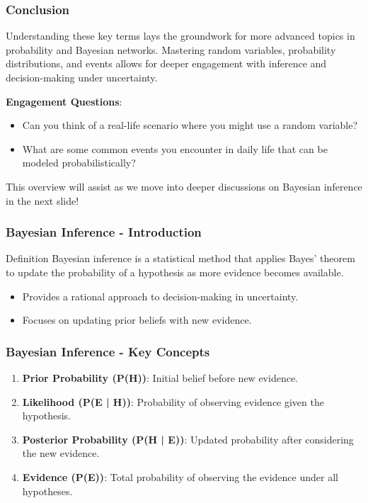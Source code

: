 \documentclass[aspectratio=169]{beamer}
\begin{document}
\begin{frame}[fragile]
  \frametitle{Conclusion}
  Understanding these key terms lays the groundwork for more advanced topics in probability and Bayesian networks. 
  Mastering random variables, probability distributions, and events allows for deeper engagement with inference and decision-making under uncertainty.
  
  \textbf{Engagement Questions}:
  \begin{itemize}
    \item Can you think of a real-life scenario where you might use a random variable?
    \item What are some common events you encounter in daily life that can be modeled probabilistically?
  \end{itemize}
  
  This overview will assist as we move into deeper discussions on Bayesian inference in the next slide!
\end{frame}

\begin{frame}[fragile]
    \frametitle{Bayesian Inference - Introduction}
    \begin{block}{Definition}
        Bayesian inference is a statistical method that applies Bayes' theorem to update the probability of a hypothesis as more evidence becomes available.
    \end{block}
    \begin{itemize}
        \item Provides a rational approach to decision-making in uncertainty.
        \item Focuses on updating prior beliefs with new evidence.
    \end{itemize}
\end{frame}

\begin{frame}[fragile]
    \frametitle{Bayesian Inference - Key Concepts}
    \begin{enumerate}
        \item \textbf{Prior Probability (P(H))}: Initial belief before new evidence.
        \item \textbf{Likelihood (P(E | H))}: Probability of observing evidence given the hypothesis.
        \item \textbf{Posterior Probability (P(H | E))}: Updated probability after considering the new evidence.
        \item \textbf{Evidence (P(E))}: Total probability of observing the evidence under all hypotheses.
    \end{enumerate}
\end{frame}
\end{document}
